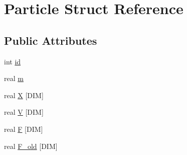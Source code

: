\hypertarget{struct_particle}{\section{Particle Struct Reference}
\label{struct_particle}
}
\subsection*{Public Attributes}
\begin{DoxyCompactItemize}
\item 
int \hyperlink{struct_particle_a544b202775517f8ba05efcb9e0a21bee}{id}
\item 
real \hyperlink{struct_particle_aa48f69912ffbf8516689a5710586e3a9}{m}
\item 
real \hyperlink{struct_particle_aac2fa2def51939805df39321397aa60e}{X} \mbox{[}D\-I\-M\mbox{]}
\item 
real \hyperlink{struct_particle_a69ff0f97b590846150012c31f04b88c8}{V} \mbox{[}D\-I\-M\mbox{]}
\item 
real \hyperlink{struct_particle_a3103793ac96498582ca8b0502c0e93d3}{F} \mbox{[}D\-I\-M\mbox{]}
\item 
real \hyperlink{struct_particle_a04a7aa77cb3cd92d826c0e8f03423955}{F\-\_\-old} \mbox{[}D\-I\-M\mbox{]}
\end{DoxyCompactItemize}


